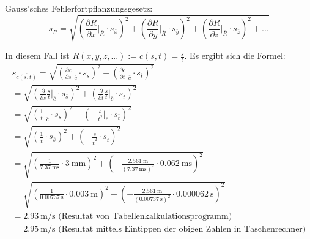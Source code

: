 Gauss'sches Fehlerfortpflanzungsgesetz:
\begin{equation}
    s_{\overline{R}} = \sqrt{ \left( \frac{\partial R}{\partial x} \biggr\rvert_{\overline{R}} \cdot s_{\overline{x}}\right)^2
                            + \left( \frac{\partial R}{\partial y} \biggr\rvert_{\overline{R}} \cdot s_{\overline{y}}\right)^2
                            + \left( \frac{\partial R}{\partial z} \biggr\rvert_{\overline{R}} \cdot s_{\overline{z}}\right)^2
                            + ... }
\end{equation}

In diesem Fall ist $R(x,y,z,...) := c(s,t) = \frac{s}{t}$. Es ergibt sich die Formel:
\begin{gather*}
    s_{\overline{c(s,t)}} = \sqrt{ \left( \frac{\partial c}{\partial s} \biggr\rvert_{\overline{c}} \cdot s_{\overline{s}}\right)^2
                            + \left( \frac{\partial c}{\partial t} \biggr\rvert_{\overline{c}} \cdot s_{\overline{t}}\right)^2 } \\
                            = \sqrt{ \left( \frac{\partial}{\partial s}\frac{s}{t} \biggr\rvert_{\overline{c}} \cdot s_{\overline{s}}\right)^2
                            + \left( \frac{\partial}{\partial t}\frac{s}{t} \biggr\rvert_{\overline{c}} \cdot s_{\overline{t}}\right)^2 } \\
                            = \sqrt{ \left( \frac{1}{t} \biggr\rvert_{\overline{c}} \cdot s_{\overline{s}}\right)^2
                            + \left( - \frac{s}{t^2} \biggr\rvert_{\overline{c}} \cdot s_{\overline{t}}\right)^2 } \\
                            = \sqrt{ \left( \frac{1}{\overline{t}} \cdot s_{\overline{s}}\right)^2
                            + \left( - \frac{\overline{s}}{\overline{t}^2} \cdot s_{\overline{t}}\right)^2 } \\
                            = \sqrt{ \left( \frac{1}{\SI{7.37}{\milli\second}} \cdot \SI{3}{\milli\meter} \right)^2
                            + \left( - \frac{\SI{2.561}{\meter}}{(\SI{7.37}{\milli\second})^2} \cdot \SI{0.062}{\milli\second}\right)^2 } \\
                            = \sqrt{ \left( \frac{1}{\SI{0.00737}{\second}} \cdot \SI{0.003}{\meter} \right)^2
                            + \left( - \frac{\SI{2.561}{\meter}}{(\SI{0.00737}{\second})^2} \cdot \SI{0.000062}{\second}\right)^2 } \\
                            = \SI{2.93}{\meter\per\second} \text{ (Resultat von Tabellenkalkulationsprogramm)} \\
                            = \SI{2.95}{\meter\per\second} \text{ (Resultat mittels Eintippen der obigen Zahlen in Taschenrechner)} \\
\end{gather*}

